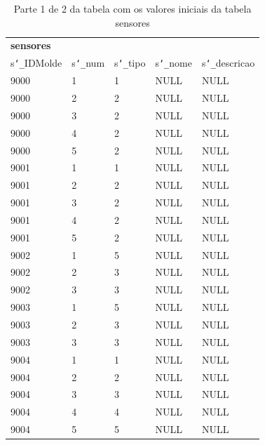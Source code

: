 \documentclass[11pt,twoside,a4paper]{report}
\begin{document}
\begin{table}
	\centering
	\begin{tabular}{|l|l|l|l|l|}
		\multicolumn{5}{l}{\textbf{sensores}}\\ \cline{1-5}
		s\texttt{\char`_}IDMolde & s\texttt{\char`_}num & s\texttt{\char`_}tipo & s\texttt{\char`_}nome & s\texttt{\char`_}descricao\\ \cline{1-5}
		9000 & 1 & 1 & NULL & NULL\\ \cline{1-5}
		9000 & 2 & 2 & NULL & NULL\\ \cline{1-5}
		9000 & 3 & 2 & NULL & NULL\\ \cline{1-5}
		9000 & 4 & 2 & NULL & NULL\\ \cline{1-5}
		9000 & 5 & 2 & NULL & NULL\\ \cline{1-5}
		9001 & 1 & 1 & NULL & NULL\\ \cline{1-5}
		9001 & 2 & 2 & NULL & NULL\\ \cline{1-5}
		9001 & 3 & 2 & NULL & NULL\\ \cline{1-5}
		9001 & 4 & 2 & NULL & NULL\\ \cline{1-5}
		9001 & 5 & 2 & NULL & NULL\\ \cline{1-5}
		9002 & 1 & 5 & NULL & NULL\\ \cline{1-5}
		9002 & 2 & 3 & NULL & NULL\\ \cline{1-5}
		9002 & 3 & 3 & NULL & NULL\\ \cline{1-5}
		9003 & 1 & 5 & NULL & NULL\\ \cline{1-5}
		9003 & 2 & 3 & NULL & NULL\\ \cline{1-5}
		9003 & 3 & 3 & NULL & NULL\\ \cline{1-5}
		9004 & 1 & 1 & NULL & NULL\\ \cline{1-5}
		9004 & 2 & 2 & NULL & NULL\\ \cline{1-5}
		9004 & 3 & 3 & NULL & NULL\\ \cline{1-5}
		9004 & 4 & 4 & NULL & NULL\\ \cline{1-5}
		9004 & 5 & 5 & NULL & NULL\\ \cline{1-5}
	\end{tabular}
	\caption[Parte 1 de 2 da tabela com os valores iniciais da tabela sensores]{Parte 1 de 2 da tabela com os valores iniciais da tabela sensores}
	\label{tab:dados5}
\end{table}
\end{document}
